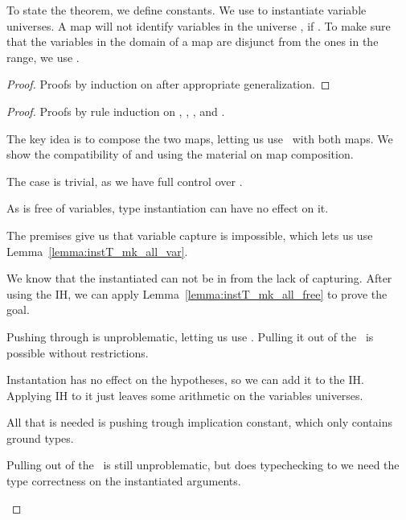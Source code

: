 To state the theorem, we define constants.
We use  to instantiate variable universes.
A map \isa{\(\sigma\)} will not identify variables in the universe , if .
To make sure that the variables in the domain of a map \isa{\(\sigma\)} are disjunct from the ones in the range, we use .


\begin{lemma}
\end{lemma}
\begin{lemma}
\end{lemma}
\begin{proof}
    Proofs by induction on  after appropriate generalization.
\end{proof}

\begin{theorem}
\end{theorem}
\begin{proof}
    Proofs by rule induction on \isa{\(\Gamma\)}, \isa{\(\Psi\)}, \isa{\(\Omega\)}, and .
    \begin{description}[]
        \item [\ax] The key idea is to compose the two maps, letting us use \ax\ with both maps. We show the compatibility of \isa{\(\Psi\)} and \isa{\(\Omega\)} using the material on map composition.
        \item [\as] The case is trivial, as we have full control over .
        \item [\wk] As  is free of variables, type instantiation can have no effect on it.
        \item [\aIv] The premises give us that variable capture is impossible, which lets us use Lemma~\ref{lemma:instT_mk_all_var}.
        \item [\aIf] We know that the instantiated  can not be in \isa{\(\Gamma\)} from the lack of capturing. After using the IH, we can apply Lemma~\ref{lemma:instT_mk_all_free} to prove the goal.
        \item [\aE] Pushing  through  is unproblematic, letting us use \aE. Pulling it out of the \isasymbullet\ is possible without restrictions.
        \item [\iI] Instantation has no effect on the hypotheses, so we can add it to the IH. Applying IH to it just leaves some arithmetic on the variables universes.
        \item [\iE] All that is needed is pushing  trough implication constant, which only contains ground types.
        \item [\bcnv] Pulling  out of the \isasymbullet\ is still unproblematic, but  does typechecking to we need the type correctness on the instantiated arguments.
    \end{description}
\end{proof}


